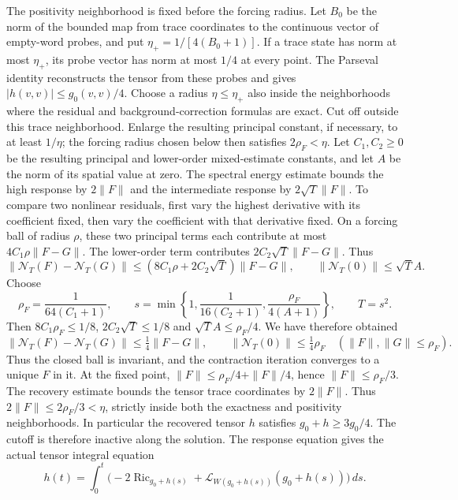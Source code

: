 The positivity neighborhood is fixed before the forcing radius.
Let $B_0$ be the norm of the bounded map from trace coordinates
to the continuous vector of empty-word probes, and put
$\eta_+=1/[4(B_0+1)]$.  If a trace state has norm at most
$\eta_+$, its probe vector has norm at most $1/4$ at every point.
The Parseval identity reconstructs the tensor from these probes and
gives $|h(v,v)|\leq g_0(v,v)/4$.  Choose a radius
$\eta\leq\eta_+$ also inside the neighborhoods where the residual
and background-correction formulas are exact.  Cut off outside this
trace neighborhood.  Enlarge the resulting principal constant, if
necessary, to at least $1/\eta$; the forcing radius chosen below
then satisfies $2\rho_F<\eta$.
Let $C_1,C_2\geq0$ be the resulting principal and lower-order
mixed-estimate constants, and let $A$ be the norm of its spatial
value at zero.  The spectral energy estimate bounds the high response
by $2\|F\|$ and the intermediate response by
$2\sqrt T\|F\|$.  To compare two nonlinear residuals, first vary the
highest derivative with its coefficient fixed, then vary the
coefficient with that derivative fixed.  On a forcing ball of radius
$\rho$, these two principal terms each contribute at most
$4C_1\rho\|F-G\|$.  The lower-order term contributes
$2C_2\sqrt T\|F-G\|$.  Thus
\[
 \|\mathcal N_T(F)-\mathcal N_T(G)\|
 \leq(8C_1\rho+2C_2\sqrt T)\|F-G\|,\qquad
 \|\mathcal N_T(0)\|\leq\sqrt T A.
\]
Choose
\[
 \rho_F=\frac1{64(C_1+1)},\qquad
 s=\min\left\{1,\frac1{16(C_2+1)},\frac{\rho_F}{4(A+1)}\right\},
 \qquad T=s^2.
\]
Then $8C_1\rho_F\leq1/8$, $2C_2\sqrt T\leq1/8$ and
$\sqrt T A\leq\rho_F/4$.  We have therefore obtained
\[
 \|\mathcal N_T(F)-\mathcal N_T(G)\|\leq\tfrac14\|F-G\|,
 \qquad \|\mathcal N_T(0)\|\leq\tfrac14\rho_F
 \quad(\|F\|,\|G\|\leq\rho_F).
\]
Thus the closed ball is invariant, and the contraction iteration converges
to a unique $F$ in it.  At the fixed point,
$\|F\|\leq\rho_F/4+\|F\|/4$, hence $\|F\|\leq\rho_F/3$.
The recovery estimate bounds the tensor trace coordinates by $2\|F\|$.
Thus $2\|F\|\leq2\rho_F/3<\eta$, strictly inside both the
exactness and positivity neighborhoods.  In particular the recovered
tensor $h$ satisfies
$g_0+h\geq3g_0/4$.  The cutoff is therefore inactive along the solution.
The response equation gives the actual tensor integral equation
\[
 h(t)=\int_0^t
   \bigl(-2\operatorname{Ric}_{g_0+h(s)}
       +\mathcal L_{W(g_0+h(s))}(g_0+h(s))\bigr)\,ds.
\]

